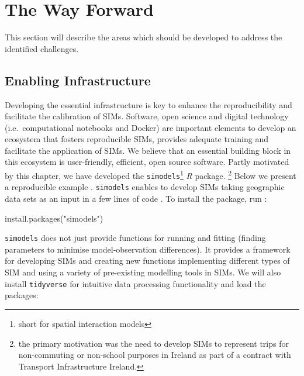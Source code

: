 \documentclass[11pt,letterpaper]{article}
\newenvironment{Shaded}{\begin{snugshade}}{\end{snugshade}}
\newcommand{\FunctionTok}[1]{\textcolor[rgb]{0.00,0.00,0.00}{#1}}
\newcommand{\NormalTok}[1]{#1}
\newcommand{\StringTok}[1]{\textcolor[rgb]{0.31,0.60,0.02}{#1}}
\begin{document}
\hypertarget{the-way-forward}{%
\section{The Way Forward}\label{the-way-forward}}

This section will describe the areas which should be developed to address the identified challenges.

\hypertarget{enabling-infrastructure}{%
\subsection{\texorpdfstring{Enabling Infrastructure }{Enabling Infrastructure }}\label{enabling-infrastructure}}

Developing the essential infrastructure is key to enhance the reproducibility and facilitate the calibration of SIMs.
Software, open science and digital technology (i.e.~computational notebooks and Docker) are important elements to develop an ecosystem that fosters reproducible SIMs, provides adequate training and facilitate the application of SIMs.
We believe that an essential building block in this ecosystem is user-friendly, efficient, open source software.
Partly motivated by this chapter, we have developed the \texttt{simodels}\footnote{short for spatial interaction models} \emph{R} package.
\footnote{the primary motivation was the need to develop SIMs to represent trips for non-commuting or non-school purposes in Ireland as part of a contract with Transport Infrastructure Ireland.} Below we present a reproducible example
. \texttt{simodels} enables to develop SIMs taking geographic data sets as an input in a few lines of code
. To install the package, run
:

\begin{Shaded}
\begin{Highlighting}[]
\FunctionTok{install.packages}\NormalTok{(}\StringTok{"simodels"}\NormalTok{)}
\end{Highlighting}
\end{Shaded}

\texttt{simodels} does not just provide functions for running and fitting (finding parameters to minimise model-observation differences).
It provides a framework for developing SIMs and creating new functions implementing different types of SIM and using a variety of pre-existing modelling tools in SIMs.
We will also install \texttt{tidyverse} for intuitive data processing functionality and load the packages:
\end{document}
